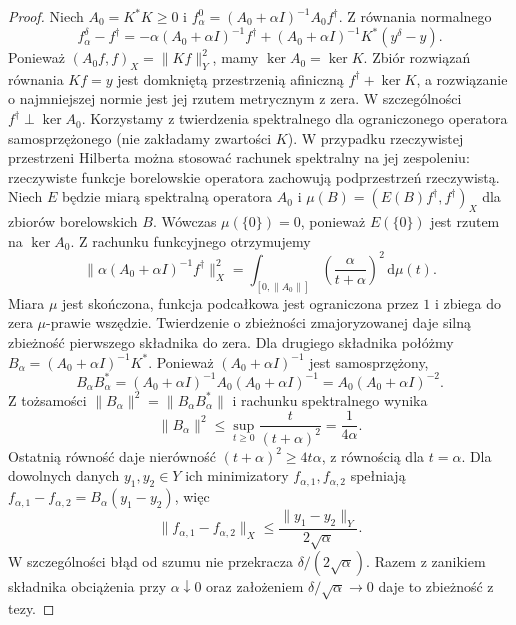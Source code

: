 \begin{proof}
Niech $A_0=K^*K\ge0$ i $f_\alpha^0=(A_0+\alpha I)^{-1}A_0f^\dagger$.
Z równania normalnego
\[
 f_\alpha^\delta-f^\dagger
 =-\alpha(A_0+\alpha I)^{-1}f^\dagger
 +(A_0+\alpha I)^{-1}K^*(y^\delta-y).
\]
Ponieważ $(A_0 f,f)_X=\|Kf\|_Y^2$, mamy
$\ker A_0=\ker K$. Zbiór rozwiązań równania $Kf=y$
jest domkniętą przestrzenią afiniczną $f^\dagger+\ker K$,
a rozwiązanie o najmniejszej normie jest jej rzutem
metrycznym z zera. W szczególności
$f^\dagger\perp\ker A_0$.
Korzystamy z twierdzenia spektralnego dla ograniczonego
operatora samosprzężonego (nie zakładamy zwartości $K$).
W przypadku rzeczywistej przestrzeni Hilberta można
stosować rachunek spektralny na jej zespoleniu:
rzeczywiste funkcje borelowskie operatora zachowują
podprzestrzeń rzeczywistą.
Niech $E$ będzie miarą spektralną operatora $A_0$
i $\mu(B)=(E(B)f^\dagger,f^\dagger)_X$ dla zbiorów
borelowskich $B$. Wówczas $\mu(\{0\})=0$, ponieważ
$E(\{0\})$ jest rzutem na $\ker A_0$.
Z rachunku funkcyjnego otrzymujemy
\[
 \|\alpha(A_0+\alpha I)^{-1}f^\dagger\|_X^2
 =\int_{[0,\|A_0\|]}
 \left(\frac{\alpha}{t+\alpha}\right)^2\,\mathrm d\mu(t).
\]
Miara $\mu$ jest skończona, funkcja podcałkowa jest
ograniczona przez $1$ i zbiega do zera $\mu$-prawie
wszędzie. Twierdzenie o zbieżności zmajoryzowanej
daje silną zbieżność pierwszego składnika do zera.
Dla drugiego składnika połóżmy
$B_\alpha=(A_0+\alpha I)^{-1}K^*$.
Ponieważ $(A_0+\alpha I)^{-1}$ jest samosprzężony,
\[
 B_\alpha B_\alpha^*
 =(A_0+\alpha I)^{-1}A_0(A_0+\alpha I)^{-1}
 =A_0(A_0+\alpha I)^{-2}.
\]
Z tożsamości $\|B_\alpha\|^2=\|B_\alpha B_\alpha^*\|$
i rachunku spektralnego wynika
\[
 \|B_\alpha\|^2
 \le\sup_{t\ge0}\frac{t}{(t+\alpha)^2}
 =\frac1{4\alpha}.
\]
Ostatnią równość daje nierówność
$(t+\alpha)^2\ge4t\alpha$, z równością dla $t=\alpha$.
Dla dowolnych danych $y_1,y_2\in Y$ ich minimizatory
$f_{\alpha,1},f_{\alpha,2}$ spełniają
$f_{\alpha,1}-f_{\alpha,2}=B_\alpha(y_1-y_2)$,
więc
\[
 \|f_{\alpha,1}-f_{\alpha,2}\|_X
 \le\frac{\|y_1-y_2\|_Y}{2\sqrt\alpha}.
\]
W szczególności błąd od szumu nie przekracza
$\delta/(2\sqrt\alpha)$. Razem z zanikiem
składnika obciążenia przy $\alpha\downarrow0$
oraz założeniem $\delta/\sqrt\alpha\to0$
daje to zbieżność z tezy.
\end{proof}


